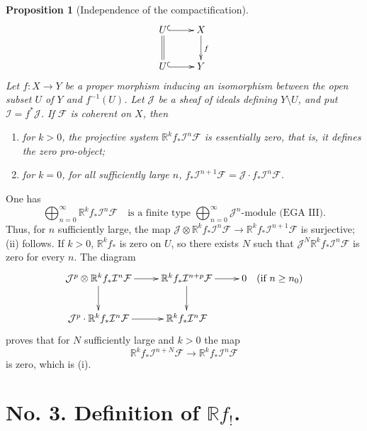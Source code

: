 \documentclass[12pt]{amsart}
\theoremstyle{plain}
\newtheorem{prop}{Proposition}
\theoremstyle{definition}
\newcommand{\cF}{\mathcal{F}}
\newcommand{\cI}{\mathcal{I}}
\newcommand{\cJ}{\mathcal{J}}
\newcommand{\bR}{\mathbb{R}}
\begin{document}
\begin{prop}[Independence of the compactification]
\[
\xymatrix{
U \ar@{^{(}->}[r] \ar@{=}[d] & X \ar[d]^f \\
U \ar@{^{(}->}[r] & Y
}
\]
Let $f:X\to Y$ be a proper morphism inducing an isomorphism between the open subset $U$ of $Y$ and $f^{-1}(U)$. Let $\cJ$ be a sheaf of ideals defining $Y\setminus U$, and put $\cI=f^*\cJ$. If $\cF$ is coherent on $X$, then
\begin{enumerate}
\item[(i)] for $k>0$, the projective system $\bR^kf_*\cI^n\cF$ is essentially zero, that is, it defines the zero pro-object;
\item[(ii)] for $k=0$, for all sufficiently large $n$, $f_*\cI^{n+1}\cF=\cJ\cdot f_*\cI^n\cF$.
\end{enumerate}
\end{prop}

One has
\[
\bigoplus_{n=0}^{\infty}\bR^kf_*\cI^n\cF\quad\text{is a finite type }\bigoplus_{n=0}^{\infty}\cJ^n\text{-module (EGA III)}.
\]
Thus, for $n$ sufficiently large, the map $\cJ\otimes\bR^kf_*\cI^n\cF\to\bR^kf_*\cI^{n+1}\cF$ is surjective; (ii) follows. If $k>0$, $\bR^kf_*$ is zero on $U$, so there exists $N$ such that $\cJ^N\bR^kf_*\cI^n\cF$ is zero for every $n$. The diagram
\[
\xymatrix{
\cJ^p\otimes\bR^kf_*\cI^n\cF \ar[r] \ar[d] & \bR^kf_*\cI^{n+p}\cF \ar[r] \ar[d] & 0 \quad (\text{if } n\ge n_0) \\
\cJ^p\cdot\bR^kf_*\cI^n\cF \ar[r] & \bR^kf_*\cI^n\cF
}
\]
proves that for $N$ sufficiently large and $k>0$ the map
\[
\bR^kf_*\cI^{n+N}\cF\to\bR^kf_*\cI^n\cF
\]
is zero, which is (i).

\section*{No. 3. Definition of $\bR f_!$.}
\end{document}
